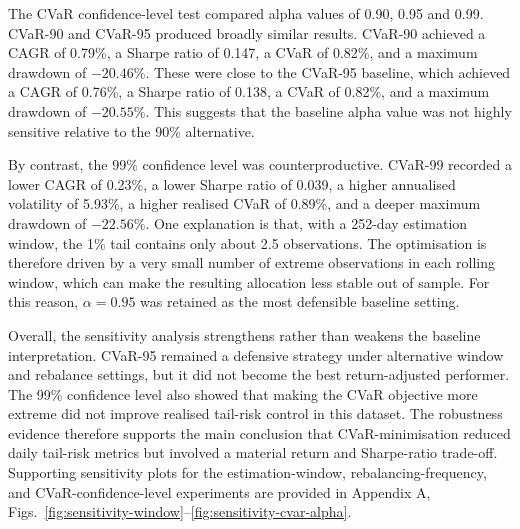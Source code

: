 \par The CVaR confidence-level test compared alpha values of 0.90, 0.95 and 0.99. CVaR-90 and CVaR-95 produced broadly similar results. CVaR-90 achieved a CAGR of 0.79\%, a Sharpe ratio of 0.147, a CVaR of 0.82\%, and a maximum drawdown of $-20.46\%$. These were close to the CVaR-95 baseline, which achieved a CAGR of 0.76\%, a Sharpe ratio of 0.138, a CVaR of 0.82\%, and a maximum drawdown of $-20.55\%$. This suggests that the baseline alpha value was not highly sensitive relative to the 90\% alternative.
\par By contrast, the 99\% confidence level was counterproductive. CVaR-99 recorded a lower CAGR of 0.23\%, a lower Sharpe ratio of 0.039, a higher annualised volatility of 5.93\%, a higher realised CVaR of 0.89\%, and a deeper maximum drawdown of $-22.56\%$. One explanation is that, with a 252-day estimation window, the 1\% tail contains only about 2.5 observations. The optimisation is therefore driven by a very small number of extreme observations in each rolling window, which can make the resulting allocation less stable out of sample. For this reason, $\alpha = 0.95$ was retained as the most defensible baseline setting.
\par Overall, the sensitivity analysis strengthens rather than weakens the baseline interpretation. CVaR-95 remained a defensive strategy under alternative window and rebalance settings, but it did not become the best return-adjusted performer. The 99\% confidence level also showed that making the CVaR objective more extreme did not improve realised tail-risk control in this dataset. The robustness evidence therefore supports the main conclusion that CVaR-minimisation reduced daily tail-risk metrics but involved a material return and Sharpe-ratio trade-off. Supporting sensitivity plots for the estimation-window, rebalancing-frequency, and CVaR-confidence-level experiments are provided in Appendix A, Figs.~\ref{fig:sensitivity-window}--\ref{fig:sensitivity-cvar-alpha}.

